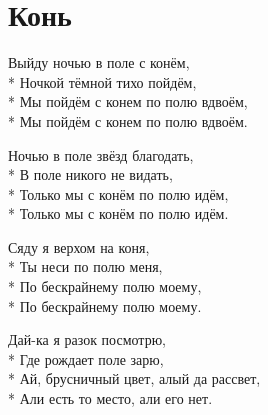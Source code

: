 \section{Конь}
\label{song:Конь}

\medskip

\begin{minipage}{\linewidth}
Выйду ночью в поле с конём,\\*
Ночкой тёмной тихо пойдём,\\*
Мы пойдём с конем по полю вдвоём,\\*
Мы пойдём с конем по полю вдвоём.\\
\end{minipage}\par\medskip\nobreak

\medskip

\begin{minipage}{\linewidth}
Ночью в поле звёзд благодать,\\*
В поле никого не видать,\\*
Только мы с конём по полю идём,\\*
Только мы с конём по полю идём.\\
\end{minipage}\par\medskip\nobreak

\medskip

\begin{minipage}{\linewidth}
Сяду я верхом на коня,\\*
Ты неси по полю меня,\\*
По бескрайнему полю моему,\\*
По бескрайнему полю моему.\\
\end{minipage}\par\medskip\nobreak

\medskip

\begin{minipage}{\linewidth}
Дай-ка я разок посмотрю,\\*
Где рождает поле зарю,\\*
Ай, брусничный цвет, алый да рассвет,\\*
Али есть то место, али его нет.\\
\end{minipage}\par\medskip\nobreak

